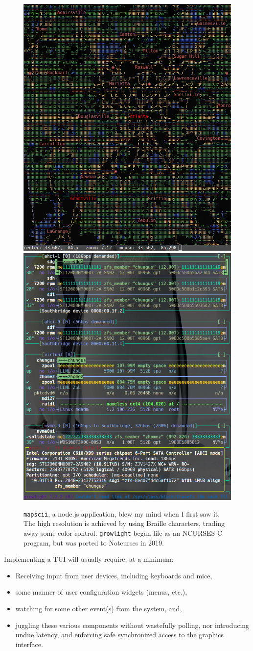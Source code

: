\documentclass[letterpaper,10pt]{article}
\newenvironment{denseitemize}{
  \begin{itemize}
      \setlength{\itemsep}{0pt}
}{
  \end{itemize}
}
\begin{document}
\begin{figure}[!htb] \centering
    \includegraphics[width=.4\linewidth]{media/tui-mapscii.png}
    \hfill
    \includegraphics[width=.4\linewidth]{media/tui-growlight.png}
    \caption[Non-NCURSES TUIs: Mapscii and Growlight.]{\texttt{mapscii}, a
    node.js application, blew my mind when I first saw it. The high resolution
    is achieved by using Braille characters, trading away some color control.
    \texttt{growlight} began life as an NCURSES C program, but was ported to
    Notcurses in 2019.}
  \label{fig:notncurses-tuis}
\end{figure}

Implementing a TUI will usually require, at a minimum:
\begin{denseitemize}
\item{Receiving input from user devices, including keyboards and mice,}
\item{some manner of user configuration widgets (menus, etc.),}
\item{watching for some other event(s) from the system, and},
\item{juggling these various components without wastefully polling, nor
       introducing undue latency, and enforcing safe synchronized access to
       the graphics interface.}
\end{denseitemize}
\end{document}
